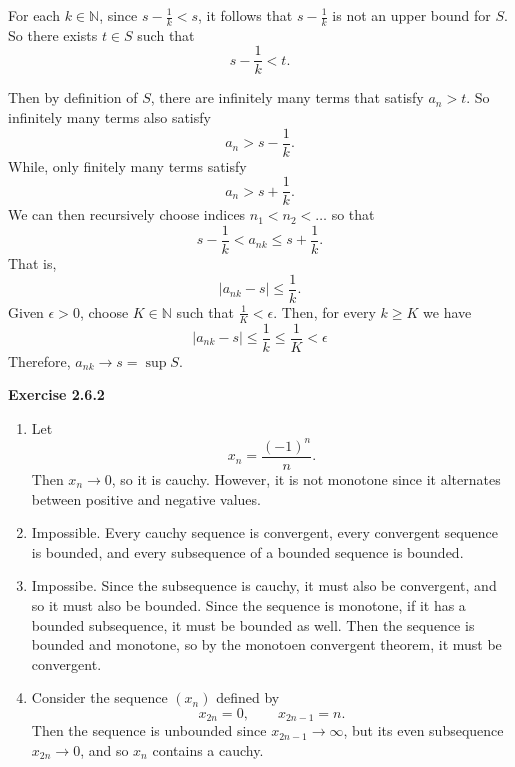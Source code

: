 \documentclass[12pt]{article}
\begin{document}
For each \( k \in \mathbb{N} \), since \( s - \frac{1}{k} < s \), it follows that
\( s - \frac{1}{k} \) is not an upper bound for \( S \).
So there exists \( t \in S \) such that
\[
    s - \frac{1}{k}  < t.
\]

Then by definition of \( S \), there are infinitely many terms that satisfy \( a_n > t \).
So infinitely many terms also satisfy
\[
    a_n > s - \frac{1}{k}.
\]
While, only finitely many terms satisfy
\[
    a_n > s + \frac{1}{k}.
\]
We can then recursively choose indices \( n_1 < n_2 < \dots  \) so that
\[
    s - \frac{1}{k} < a_{nk} \le s + \frac{1}{k}.
\]
That is,
\[
    \vert a_{nk} - s \vert \leq  \frac{1}{k}.
\]
Given \( \epsilon > 0 \), choose \( K \in \mathbb{N} \) such that \( \frac{1}{K} < \epsilon \).
Then, for every \( k \geq K \) we have
\[
    \vert a_{nk} - s \vert \leq \frac{1}{k} \leq \frac{1}{K} < \epsilon
\]
Therefore,
\( a_{nk} \to s = \sup S.
\)

\textbf{Exercise 2.6.2}
\begin{enumerate}[label=(\alph*)]
    \item Let
          \[
              x_n = \frac{(-1)^n}{n}.
          \]
          Then \( x_n \to 0 \), so it is cauchy.
          However, it is not monotone since it alternates between positive and negative values.
    \item Impossible.
          Every cauchy sequence is convergent, every convergent sequence is bounded,
          and every subsequence of a bounded sequence is bounded.
    \item Impossibe. Since the subsequence is cauchy, it must also be convergent, and so it must also be bounded.
          Since the sequence is monotone, if it has a bounded subsequence, it must be bounded as well.
          Then the sequence is bounded and monotone, so by the monotoen convergent theorem, it must be convergent.

    \item Consider the sequence \( (x_n) \) defined by
          \[
              x_{2n} = 0, \qquad  x_{2n-1} = n.
          \]
          Then the sequence is unbounded since \( x_{2n-1} \to \infty \),
          but its even subsequence \( x_{2n} \to 0 \), and so \( x_n \) contains a cauchy.

\end{enumerate}
\end{document}

